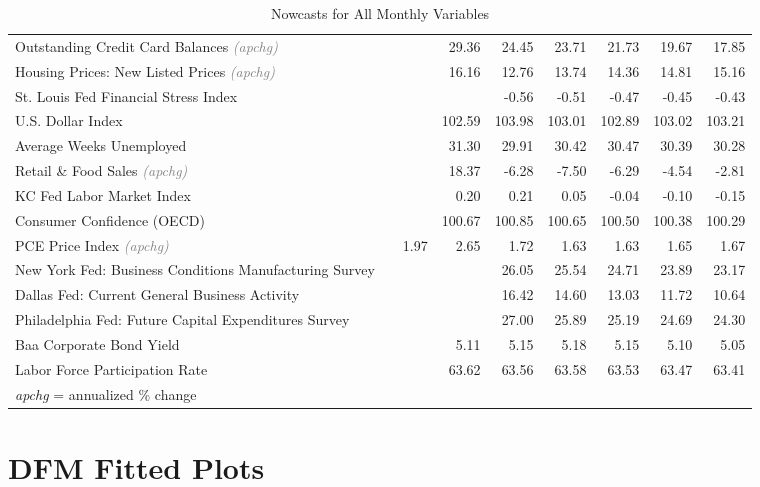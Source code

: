 \documentclass[11pt, letterpaper]{article}\usepackage[]{graphicx}\usepackage[]{color}
\begin{document}
\begin{table}[H]
\begin{tabular}{lrrrrrrrr}
  Outstanding Credit Card Balances \textit{\footnotesize\textcolor{gray}{(apchg)}} &  &  & 29.36 & 24.45 & 23.71 & 21.73 & 19.67 & 17.85 \\ 
  Housing Prices: New Listed Prices \textit{\footnotesize\textcolor{gray}{(apchg)}} &  &  & 16.16 & 12.76 & 13.74 & 14.36 & 14.81 & 15.16 \\ 
  St. Louis Fed Financial Stress Index &  &  &  & -0.56 & -0.51 & -0.47 & -0.45 & -0.43 \\ 
  U.S. Dollar Index &  &  & 102.59 & 103.98 & 103.01 & 102.89 & 103.02 & 103.21 \\ 
  Average Weeks Unemployed &  &  & 31.30 & 29.91 & 30.42 & 30.47 & 30.39 & 30.28 \\ 
  Retail \& Food Sales \textit{\footnotesize\textcolor{gray}{(apchg)}} &  &  & 18.37 & -6.28 & -7.50 & -6.29 & -4.54 & -2.81 \\ 
  KC Fed Labor Market Index &  &  & 0.20 & 0.21 & 0.05 & -0.04 & -0.10 & -0.15 \\ 
  Consumer Confidence (OECD) &  &  & 100.67 & 100.85 & 100.65 & 100.50 & 100.38 & 100.29 \\ 
  PCE Price Index \textit{\footnotesize\textcolor{gray}{(apchg)}} &  & 1.97 & 2.65 & 1.72 & 1.63 & 1.63 & 1.65 & 1.67 \\ 
  New York Fed: Business Conditions Manufacturing Survey &  &  &  & 26.05 & 25.54 & 24.71 & 23.89 & 23.17 \\ 
  Dallas Fed: Current General Business Activity &  &  &  & 16.42 & 14.60 & 13.03 & 11.72 & 10.64 \\ 
  Philadelphia Fed: Future Capital Expenditures Survey &  &  &  & 27.00 & 25.89 & 25.19 & 24.69 & 24.30 \\ 
  Baa Corporate Bond Yield &  &  & 5.11 & 5.15 & 5.18 & 5.15 & 5.10 & 5.05 \\ 
  Labor Force Participation Rate &  &  & 63.62 & 63.56 & 63.58 & 63.53 & 63.47 & 63.41 \\ 
   \hline 
 \textit{apchg} = annualized \% change 
\end{tabular}
\endgroup
\caption{Nowcasts for All Monthly Variables} 
\end{table}



\appendix
\appendixpage
\addappheadtotoc

\section{DFM Fitted Plots}
\end{document}
